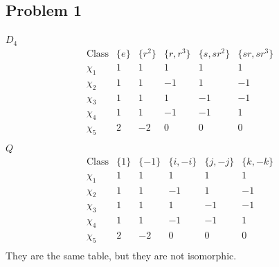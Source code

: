 \documentclass[12pt, letterpaper]{article}
\theoremstyle{definition}
\begin{document}
\pagestyle{fancy}
\fancyhf{}
\fancyhead[ROE]{\thepage}

\subsection*{Problem 1}
\large$D_4$
\[
\begin{array}{c|ccccc}
\text{Class} & \{e\} & \{r^2\} & \{r, r^3\} & \{s, sr^2\} & \{sr, sr^3\} \\
\hline
\chi_1 & 1 & 1 & 1 & 1 & 1 \\
\chi_2 & 1 & 1 & -1 & 1 & -1 \\
\chi_3 & 1 & 1 & 1 & -1 & -1 \\
\chi_4 & 1 & 1 & -1 & -1 & 1 \\
\chi_5 & 2 & -2 & 0 & 0 & 0 \\
\end{array}
\]
\large$Q$
\[
\begin{array}{c|ccccc}
\text{Class} & \{1\} & \{-1\} & \{i, -i\} & \{j, -j\} & \{k, -k\} \\
\hline
\chi_1 & 1 & 1 & 1 & 1 & 1 \\
\chi_2 & 1 & 1 & -1 & 1 & -1 \\
\chi_3 & 1 & 1 & 1 & -1 & -1 \\
\chi_4 & 1 & 1 & -1 & -1 & 1 \\
\chi_5 & 2 & -2 & 0 & 0 & 0 \\
\end{array}
\]
They are the same table, but they are not isomorphic.

\newpage
\end{document}
